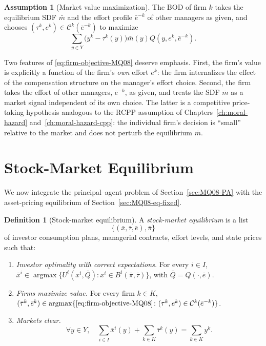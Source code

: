 \documentclass[11pt,a4paper,oneside]{book}
\DeclareMathOperator*{\argmax}{argmax}
\theoremstyle{plain}
\theoremstyle{definition}
\newtheorem{definition}[theorem]{Definition}
\newtheorem{assumption}[theorem]{Assumption}
\theoremstyle{remark}
\numberwithin{equation}{chapter}
\begin{document}
\begin{assumption}[Market value maximization]\label{ass:MV-max}
The BOD of firm $k$ takes the equilibrium SDF $\bar{m}$ and the effort profile $\bar{e}^{-k}$ of other managers as given, and chooses $(\tau^k, e^k) \in \mathcal{C}^k(\bar{e}^{-k})$ to maximize
\begin{equation}\label{eq:firm-objective-MQ08}
  \sum_{y \in Y} \bigl( y^k - \tau^k(y) \bigr) \bar{m}(y) Q(y, e^k, \bar{e}^{-k}).
\end{equation}
\end{assumption}

Two features of \eqref{eq:firm-objective-MQ08} deserve emphasis.
First, the firm's value is explicitly a function of the firm's \emph{own} effort $e^k$: the firm internalizes the effect of the compensation structure on the manager's effort choice.
Second, the firm takes the effort of other managers, $\bar{e}^{-k}$, as given, and treats the SDF $\bar{m}$ as a market signal independent of its own choice.
The latter is a competitive price-taking hypothesis analogous to the RCPP assumption of Chapters~\ref{ch:moral-hazard} and~\ref{ch:moral-hazard-cpp}: the individual firm's decision is ``small'' relative to the market and does not perturb the equilibrium $\bar{m}$.

\section{Stock-Market Equilibrium}
\label{sec:MQ08-full-eq}

We now integrate the principal--agent problem of Section~\ref{sec:MQ08-PA} with the asset-pricing equilibrium of Section~\ref{sec:MQ08-eq-fixed}.

\begin{definition}[Stock-market equilibrium]\label{def:MQ08-full-eq}
A \emph{stock-market equilibrium} is a list
\begin{equation*}
  \bigl\{ (\bar{x}, \bar{\tau}, \bar{e}), \bar{\pi} \bigr\}
\end{equation*}
of investor consumption plans, managerial contracts, effort levels, and state prices such that:
\begin{enumerate}
  \item[(a)] \emph{Investor optimality with correct expectations.}
  For every $i \in I$, $\bar{x}^i \in \argmax \{ U^i(x^i, \bar{Q}) \colon x^i \in B^i(\bar{\pi}, \bar{\tau}) \}$, with $\bar{Q} = Q(\cdot, \bar{e})$.
  \item[(b)] \emph{Firms maximize value.}
  For every firm $k \in K$, $(\bar{\tau}^k, \bar{e}^k) \in \argmax \{ \eqref{eq:firm-objective-MQ08} \colon (\tau^k, e^k) \in \mathcal{C}^k(\bar{e}^{-k}) \}$.
  \item[(c)] \emph{Markets clear.}
  \begin{equation*}
    \forall y \in Y, \quad \sum_{i \in I} \bar{x}^i(y) + \sum_{k \in K} \bar{\tau}^k(y) = \sum_{k \in K} y^k.
  \end{equation*}
\end{enumerate}
\end{definition}
\end{document}
